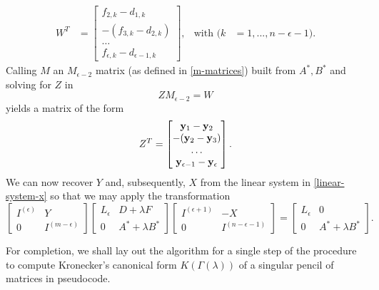 \begin{cs}
    \begin{align*}
        W^T &=
        \begin{bmatrix}
            f_{2, k} - d_{1, k} \\
            - (f_{3, k} - d_{2, k}) \\
            \hdots \\
            f_{\epsilon, k} - d_{\epsilon - 1, k}
        \end{bmatrix}, &
        \text{with } (k &= 1, ..., n - \epsilon - 1).
    \end{align*}
    Calling \(M\) an \(M_{\epsilon - 2}\) matrix (as defined in \eqref{m-matrices}) built from \(A^*, B^*\) and
    solving for \(Z\) in
    \[
        ZM_{\epsilon - 2} = W
    \]
    yields a matrix of the form
    \[
        Z^T =
        \begin{bmatrix}
            \vb{y}_{1} - \vb{y}_{2} \\
            - (\vb{y}_{2} - \vb{y}_{3}) \\
            \hdots \\
            \vb{y}_{\epsilon-1} - \vb{y}_{\epsilon}
        \end{bmatrix}.
    \]
    We can now recover \(Y\) and, subsequently, \(X\) from the linear system in \eqref{linear-system-x} so that
    we may apply the transformation
    \[
        \begin{bmatrix}
            I^{(\epsilon)} & Y \\
            0 & I^{(m - \epsilon)}
        \end{bmatrix}
        \begin{bmatrix}
            L_{\epsilon} & D + \lambda F \\
            0 & A^* + \lambda B^*
        \end{bmatrix}
        \begin{bmatrix}
            I^{(\epsilon + 1)} & -X \\
            0 & I^{(n - \epsilon - 1)}
        \end{bmatrix}
        = \begin{bmatrix}
            L_{\epsilon} & 0 \\
            0 & A^* + \lambda B^*
        \end{bmatrix}.
    \]

    For completion, we shall lay out the algorithm for a single step of the procedure to compute
    Kronecker's canonical form \(K(\Gamma(\lambda))\) of a singular pencil of matrices in pseudocode.


\end{cs}
